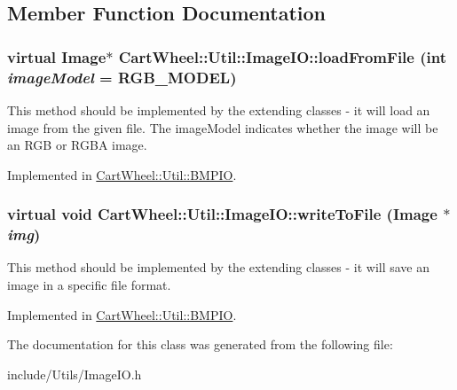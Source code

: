\subsection{Member Function Documentation}
\hypertarget{classCartWheel_1_1Util_1_1ImageIO_a49fb3a4d44a8cabeb66ca06eca15879f}{
\subsubsection[{loadFromFile}]{\setlength{\rightskip}{0pt plus 5cm}virtual {\bf Image}$\ast$ CartWheel::Util::ImageIO::loadFromFile (int {\em imageModel} = {\ttfamily RGB\_\-MODEL})}}
\label{classCartWheel_1_1Util_1_1ImageIO_a49fb3a4d44a8cabeb66ca06eca15879f}
This method should be implemented by the extending classes -\/ it will load an image from the given file. The imageModel indicates whether the image will be an RGB or RGBA image. 

Implemented in \hyperlink{classCartWheel_1_1Util_1_1BMPIO_a1dd8a7208f86e519a8446c1e2eb55f51}{CartWheel::Util::BMPIO}.

\hypertarget{classCartWheel_1_1Util_1_1ImageIO_a49ce6fbe969f416bc526954f4d13b062}{
\subsubsection[{writeToFile}]{\setlength{\rightskip}{0pt plus 5cm}virtual void CartWheel::Util::ImageIO::writeToFile ({\bf Image} $\ast$ {\em img})}}
\label{classCartWheel_1_1Util_1_1ImageIO_a49ce6fbe969f416bc526954f4d13b062}
This method should be implemented by the extending classes -\/ it will save an image in a specific file format. 

Implemented in \hyperlink{classCartWheel_1_1Util_1_1BMPIO_a5669139891fc0f0499c115c55c0b309b}{CartWheel::Util::BMPIO}.



The documentation for this class was generated from the following file:\begin{DoxyCompactItemize}
\item 
include/Utils/ImageIO.h\end{DoxyCompactItemize}
